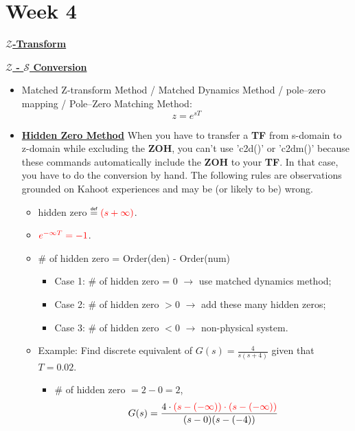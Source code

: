 \section{Week 4}
\begin{center}
    \textbf{\large \underline{$\bm{\mathcal{Z}}$-Transform}}
\end{center}

\textbf{\large \underline{$\mathcal{Z}$ - $\mathcal{S}$ Conversion}}
\begin{itemize}
    \item Matched Z-transform Method / Matched Dynamics Method / pole–zero mapping / Pole–Zero Matching Method: 
    \begin{equation*}
        z = e^{sT}
    \end{equation*}
    \item \textbf{\underline{Hidden Zero Method}} When you have to transfer a \textbf{TF} from s-domain to z-domain while excluding the \textbf{ZOH}, you can't use 'c2d()' or 'c2dm()' because these commands automatically include the \textbf{ZOH} to your \textbf{TF}. In that case, you have to do the conversion by hand. The following rules are observations grounded on Kahoot experiences and may be (or likely to be) wrong. 
    \begin{itemize}
        \item hidden zero $\eqdef \color{red} (s+\infty)$.
        \item $\color{red} e^{-\infty T} = -1$.
        \item \# of hidden zero = Order(den) - Order(num)
        \begin{itemize}
            \item Case 1: \# of hidden zero = 0 $\to$ use matched dynamics method;
            \item Case 2: \# of hidden zero $> 0$ $\to$ add these many hidden zeros;
            \item Case 3: \# of hidden zero $< 0$ $\to$ non-physical system.
        \end{itemize}
        \item Example: Find discrete equivalent of $G(s)=\frac{4}{s(s+4)}$ given that $T=0.02$.
        \begin{itemize}
            \item \# of hidden zero $= 2 - 0 =2$,
            \begin{align*}
                G(s) &= \frac{4\cdot \color{red}(s-(-\infty))\cdot \color{red}(s-(-\infty))}{(s-0)(s-(-4))} \\

\end{align*}
\end{itemize}
\end{itemize}
\end{itemize}
